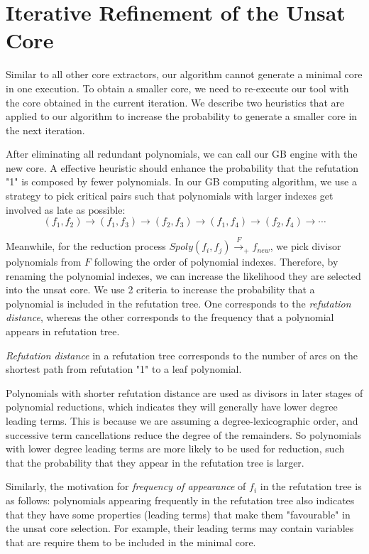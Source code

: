 \section{Iterative Refinement of the Unsat Core}
Similar to all other core extractors, our algorithm cannot generate a
minimal core in one execution. To obtain a smaller core, we need to
re-execute our tool with the core obtained in the current
iteration. We describe two heuristics that are applied to our
algorithm to increase the probability to generate a smaller core in
the next iteration. 

After eliminating all redundant polynomials, we can call our GB engine
with the new core. A effective heuristic should enhance the
probability that the refutation "1" is composed by fewer polynomials. 
In our GB computing algorithm, we use a strategy to pick critical
pairs such that polynomials with  larger indexes get involved as late
as possible: 
$$(f_1,f_2)\to(f_1,f_3)\to(f_2,f_3)\to(f_1,f_4)\to(f_2,f_4)\to\cdots$$

Meanwhile, for the reduction process $Spoly(f_i,f_j)\xrightarrow{F}_+
f_{new}$, we pick divisor polynomials from $F$ following the order of
polynomial indexes. Therefore, by renaming the polynomial indexes, we
can increase the likelihood they are selected into the unsat core. 
We use 2 criteria to increase the probability that a polynomial is
included in the refutation tree.  One corresponds to the \emph{refutation distance},
whereas the other corresponds to the frequency that
a polynomial appears in refutation tree. 

\begin{definition}
\emph{Refutation distance} in a refutation tree corresponds to the number of arcs on
the shortest path from refutation "1" to a leaf
polynomial.
\end{definition}

Polynomials with shorter refutation distance are used as
divisors in later stages of polynomial reductions, which indicates
they will generally have lower degree leading terms.  
This is because we are assuming a degree-lexicographic order, and
successive term cancellations reduce the degree of the remainders. So
polynomials with lower degree leading terms are more  likely to be
used for reduction, such that the probability that they appear in
the refutation tree is larger.  

Similarly, the motivation for \emph{frequency of appearance} of $f_i$ in
the refutation tree is as follows: polynomials appearing frequently in
the refutation tree also indicates that they have some properties
(leading terms) that make them "favourable" in the unsat core
selection. For example, their leading terms may contain variables
that are require them to be included in the minimal core. 

